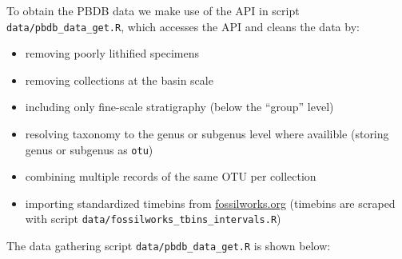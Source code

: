 \documentclass[]{article}
\providecommand{\tightlist}{%
  \setlength{\itemsep}{0pt}\setlength{\parskip}{0pt}}
\begin{document}
To obtain the PBDB data we make use of the API in script
\texttt{data/pbdb\_data\_get.R}, which accesses the API and cleans the
data by:

\begin{itemize}
\tightlist
\item
  removing poorly lithified specimens
\item
  removing collections at the basin scale
\item
  including only fine-scale stratigraphy (below the ``group'' level)
\item
  resolving taxonomy to the genus or subgenus level where availible
  (storing genus or subgenus as \texttt{otu})
\item
  combining multiple records of the same OTU per collection
\item
  importing standardized timebins from \url{fossilworks.org} (timebins
  are scraped with script \texttt{data/fossilworks\_tbins\_intervals.R})
\end{itemize}

The data gathering script \texttt{data/pbdb\_data\_get.R} is shown
below:
\end{document}
